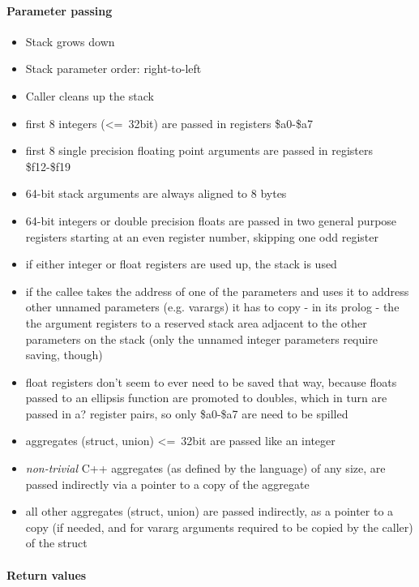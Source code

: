 \paragraph{Parameter passing}

\begin{itemize}
\item Stack grows down
\item Stack parameter order: right-to-left
\item Caller cleans up the stack
\item first 8 integers (\textless=\ 32bit) are passed in registers \$a0-\$a7
\item first 8 single precision floating point arguments are passed in registers \$f12-\$f19
\item 64-bit stack arguments are always aligned to 8 bytes
\item 64-bit integers or double precision floats are passed in two general purpose registers starting at an even register number, skipping one odd register
\item if either integer or float registers are used up, the stack is used
\item if the callee takes the address of one of the parameters and uses it to address other unnamed parameters (e.g. varargs) it has to copy - in its prolog - the the argument registers to a reserved stack area adjacent to the other parameters on the stack (only the unnamed integer parameters require saving, though) %
\item float registers don't seem to ever need to be saved that way, because floats passed to an ellipsis function are promoted to doubles, which in turn are passed in a? register pairs, so only \$a0-\$a7 are need to be spilled
\item aggregates (struct, union) \textless=\ 32bit are passed like an integer
\item {\it non-trivial} C++ aggregates (as defined by the language) of any size, are passed indirectly via a pointer to a copy of the aggregate
\item all other aggregates (struct, union) are passed indirectly, as a pointer to a copy (if needed, and for vararg arguments required to be copied by the caller) of the struct
\end{itemize}

\paragraph{Return values}

